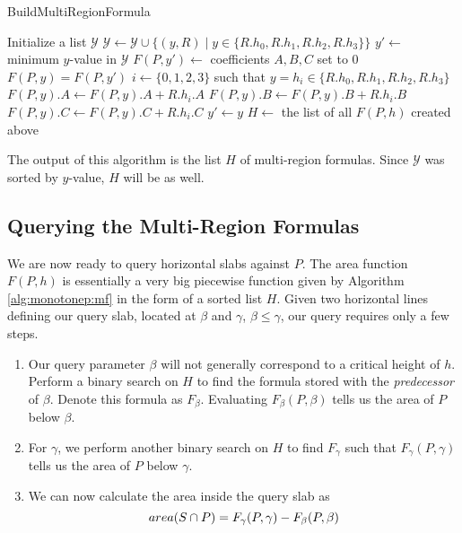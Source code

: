 \begin{algorithm}
\LinesNumbered
\DontPrintSemicolon
\caption{BuildMultiRegionFormula}
\label{alg:monotonep:mf}
\BlankLine
Initialize a list $\mathcal{Y}$\;
{
$\mathcal{Y} \gets \mathcal{Y} \cup \{ (y,R) \;|\; y \in \{R.h_0, R.h_1, R.h_2, R.h_3\}\}$\;
}
\;
\BlankLine
$y' \gets $ minimum $y$-value in $\mathcal{Y}$\;
$F(P, y') \gets $ coefficients $A,B,C$ set to 0\;
\BlankLine
{}
{
$F(P, y) = F(P, y')$\;
$i \gets \{0,1,2,3\}$ such that $y = h_i \in \{R.h_0, R.h_1, R.h_2, R.h_3\}$\;
$F(P,y).A \gets F(P,y).A + R.h_i.A$\;
$F(P,y).B \gets F(P,y).B + R.h_i.B$\;
$F(P,y).C \gets F(P,y).C + R.h_i.C$\;
\BlankLine
$y' \gets y$\;
}
\BlankLine
$H \gets $ the list of all $F(P, h)$ created above\;
\end{algorithm}

The output of this algorithm is the list $H$ of multi-region formulas. Since $\mathcal{Y}$ was sorted by $y$-value, $H$ will be as well.


\subsection{Querying the Multi-Region Formulas}
\label{:monotonep:query-mf}

We are now ready to query horizontal slabs against $P$. The area function $F(P,h)$ is essentially a very big piecewise function given by Algorithm \ref{alg:monotonep:mf} in the form of a sorted list $H$. Given two horizontal lines defining our query slab, located at $\beta$ and $\gamma$, $\beta \leq \gamma$, our query requires only a few steps.

\begin{enumerate}
\item Our query parameter $\beta$ will not generally correspond to a critical height of $h$. Perform a binary search on $H$ to find the formula stored with the \emph{predecessor} of $\beta$. Denote this formula as $F_\beta$. Evaluating $F_\beta(P, \beta)$ tells us the area of $P$ below $\beta$.

\item For $\gamma$, we perform another binary search on $H$ to find $F_\gamma$ such that $F_\gamma(P, \gamma)$ tells us the area of $P$ below $\gamma$.

\item We can now calculate the area inside the query slab as
\[ 
area(S \cap P) = F_\gamma(P, \gamma) - F_\beta(P, \beta)
\]

\end{enumerate}

